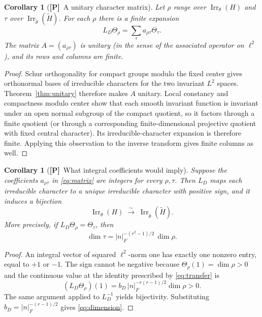 \documentclass[11pt]{article}
\newcommand{\Irr}{\operatorname{Irr}}
\newcommand{\tH}{\widetilde H}
\newcommand{\Ptag}{\textnormal{\textbf{[P]}}}
\theoremstyle{plain}
\newtheorem{corollary}[theorem]{Corollary}
\theoremstyle{definition}
\begin{document}
\begin{corollary}[\Ptag\ A unitary character matrix]\label{cor:matrix}
Let $\rho$ range over $\Irr_\theta(H)$ and $\tau$ over $\Irr_{\widetilde\theta}(\tH)$. For each $\rho$ there is a \emph{finite} expansion
\begin{equation}\label{eq:matrix}
L_D\Theta_\rho=\sum_{\tau}a_{\rho\tau}\Theta_\tau.
\end{equation}
The matrix $A=(a_{\rho\tau})$ is unitary (in the sense of the associated operator on $\ell^2$), and its rows and columns are finite.
\end{corollary}
\begin{proof}
Schur orthogonality for compact groups modulo the fixed center gives orthonormal bases of irreducible characters for the two invariant $L^2$ spaces. Theorem~\ref{thm:unitary} therefore makes $A$ unitary. Local constancy and compactness modulo center show that each smooth invariant function is invariant under an open normal subgroup of the compact quotient, so it factors through a finite quotient (or through a corresponding finite-dimensional projective quotient with fixed central character). Its irreducible-character expansion is therefore finite. Applying this observation to the inverse transform gives finite columns as well.
\end{proof}

\begin{corollary}[\Ptag\ What integral coefficients would imply]\label{cor:integrality}
Suppose the coefficients $a_{\rho\tau}$ in \eqref{eq:matrix} are integers for every $\rho,\tau$. Then $L_D$ maps each irreducible character to a unique irreducible character with positive sign, and it induces a bijection
\[
\Irr_\theta(H)\;\xrightarrow{\sim}\;\Irr_{\widetilde\theta}(\tH).
\]
More precisely, if $L_D\Theta_\rho=\Theta_\tau$, then
\begin{equation}\label{eq:dimension}
\boxed{\qquad\dim\tau=|n|_F^{-(r^2-1)/2}\,\dim\rho.\qquad}
\end{equation}
\end{corollary}
\begin{proof}
An integral vector of squared $\ell^2$-norm one has exactly one nonzero entry, equal to $+1$ or $-1$. The sign cannot be negative because $\Theta_\rho(1)=\dim\rho>0$ and the continuous value at the identity prescribed by \eqref{eq:transfer} is
\[
(L_D\Theta_\rho)(1)
=b_D\,|n|_F^{-r(r-1)/2}\dim\rho>0.
\]
The same argument applied to $L_D^{-1}$ yields bijectivity. Substituting $b_D=|n|_F^{-(r-1)/2}$ gives \eqref{eq:dimension}.
\end{proof}
\end{document}
